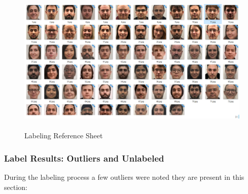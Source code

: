 \documentclass[11pt]{article}
\begin{document}
        \begin{figure}[ht]
            \centering
            \includegraphics[height=7cm]{./Images/labeling/cheatsheet.png}
            \caption{Labeling Reference Sheet}
            \label{fig:label:cheatsheet}
        \end{figure}

    \subsubsection{Label Results: Outliers and Unlabeled}\label{sec:face_labeling:outliers}
        During the labeling process a few outliers were noted they are present in this section:
\end{document}
